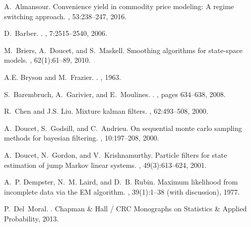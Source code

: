 \documentclass[nolayout]{article}
\theoremstyle{plain}
\theoremstyle{definition}
\newcommand{\1}{\mathbbm{1}}
\begin{document}
\newcommand{\etalchar}[1]{$^{#1}$}
\begin{thebibliography}{FGDW02}

A.~Almansour.
\newblock Convenience yield in commodity price modeling: A regime switching
  approach.
, 53:238--247, 2016.

D.~Barber.
.
, 7:2515--2540, 2006.

M.~Briers, A.~Doucet, and S.~Maskell.
\newblock Smoothing algorithms for state-space models.
, 62(1):61--89, 2010.

A.E. Bryson and M.~Frazier.
.
, 1963.

S.~Barembruch, A.~Garivier, and E.~Moulines.
.
,
  pages 634--638, 2008.

R.~Chen and J.S. Liu.
\newblock Mixture kalman filters.
, 62:493--508, 2000.

A.~Doucet, S.~Godsill, and C.~Andrieu.
\newblock On sequential monte carlo sampling methods for bayesian filtering.
, 10:197--208, 2000.

A.~Doucet, N.~Gordon, and V.~Krishnamurthy.
\newblock Particle filters for state estimation of jump {M}arkov linear
  systems.
, 49(3):613--624,
  2001.

A.~P. Dempster, N.~M. Laird, and D.~B. Rubin.
\newblock Maximum likelihood from incomplete data via the {EM} algorithm.
, 39(1):1--38 (with
  discussion), 1977.

P.~Del~Moral.
.
\newblock Chapman \& Hall / CRC Monographs on Statistics \& Applied
  Probability, 2013.


\end{thebibliography}
\end{document}
